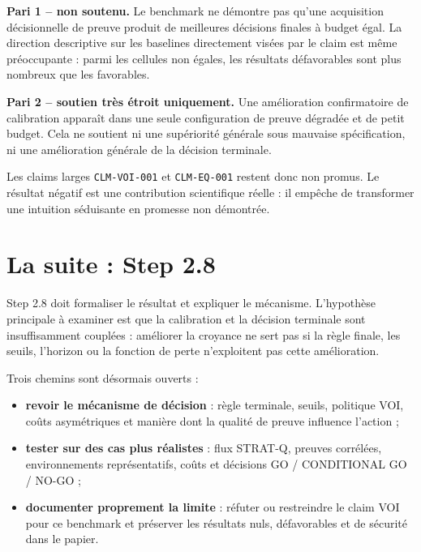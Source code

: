 \documentclass[11pt,a4paper]{article}
\newcommand{\claimvoi}{\texttt{CLM-VOI-001}}
\newcommand{\claimeq}{\texttt{CLM-EQ-001}}
\begin{document}
\begin{tcolorbox}[colback=softred,colframe=red!60!black,boxrule=0.7pt,arc=2mm]
\textbf{Pari 1 -- non soutenu.} Le benchmark ne démontre pas qu'une acquisition décisionnelle de preuve produit de meilleures décisions finales à budget égal. La direction descriptive sur les baselines directement visées par le claim est même préoccupante : parmi les cellules non égales, les résultats défavorables sont plus nombreux que les favorables.
\end{tcolorbox}

\begin{tcolorbox}[colback=softgreen,colframe=green!45!black,boxrule=0.7pt,arc=2mm]
\textbf{Pari 2 -- soutien très étroit uniquement.} Une amélioration confirmatoire de calibration apparaît dans une seule configuration de preuve dégradée et de petit budget. Cela ne soutient ni une supériorité générale sous mauvaise spécification, ni une amélioration générale de la décision terminale.
\end{tcolorbox}

Les claims larges \claimvoi{} et \claimeq{} restent donc non promus. Le résultat négatif est une contribution scientifique réelle : il empêche de transformer une intuition séduisante en promesse non démontrée.

\section*{La suite : Step 2.8}

Step 2.8 doit formaliser le résultat et expliquer le mécanisme. L'hypothèse principale à examiner est que la calibration et la décision terminale sont insuffisamment couplées : améliorer la croyance ne sert pas si la règle finale, les seuils, l'horizon ou la fonction de perte n'exploitent pas cette amélioration.

Trois chemins sont désormais ouverts :

\begin{itemize}
  \item \textbf{revoir le mécanisme de décision} : règle terminale, seuils, politique VOI, coûts asymétriques et manière dont la qualité de preuve influence l'action ;
  \item \textbf{tester sur des cas plus réalistes} : flux STRAT-Q, preuves corrélées, environnements représentatifs, coûts et décisions GO / CONDITIONAL GO / NO-GO ;
  \item \textbf{documenter proprement la limite} : réfuter ou restreindre le claim VOI pour ce benchmark et préserver les résultats nuls, défavorables et de sécurité dans le papier.
\end{itemize}
\end{document}
